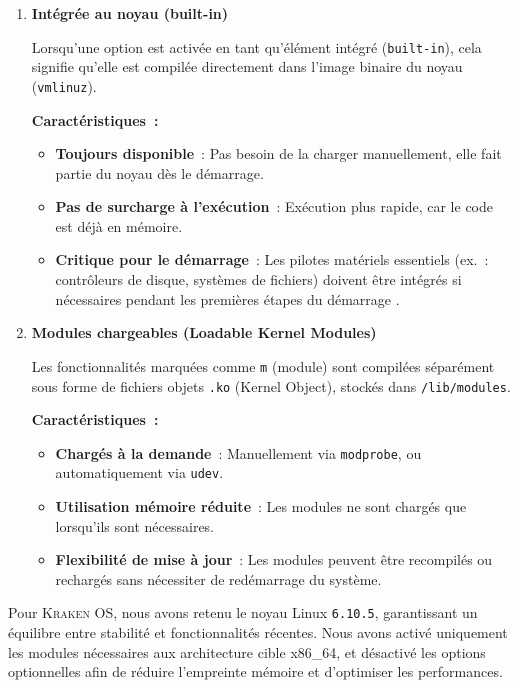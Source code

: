 \begin{enumerate}
  \item \textbf{Intégrée au noyau (built-in)}

  Lorsqu'une option est activée en tant qu’élément intégré (\texttt{built-in}), cela signifie qu’elle est compilée directement dans l’image binaire du noyau (\texttt{vmlinuz}).

  \textbf{Caractéristiques :}
  \begin{itemize}
    \item \textbf{Toujours disponible} : Pas besoin de la charger manuellement, elle fait partie du noyau dès le démarrage.
    \item \textbf{Pas de surcharge à l’exécution} : Exécution plus rapide, car le code est déjà en mémoire.
    \item \textbf{Critique pour le démarrage} : Les pilotes matériels essentiels (ex. : contrôleurs de disque, systèmes de fichiers) doivent être intégrés si nécessaires pendant les premières étapes du démarrage .
  \end{itemize}

  \item \textbf{Modules chargeables (Loadable Kernel Modules)}

  Les fonctionnalités marquées comme \texttt{m} (module) sont compilées séparément sous forme de fichiers objets \texttt{.ko} (Kernel Object), stockés dans \texttt{/lib/modules}.

  \textbf{Caractéristiques :}
  \begin{itemize}
    \item \textbf{Chargés à la demande} : Manuellement via \texttt{modprobe}, ou automatiquement via \texttt{udev}.
    \item \textbf{Utilisation mémoire réduite} : Les modules ne sont chargés que lorsqu’ils sont nécessaires.
    \item \textbf{Flexibilité de mise à jour} : Les modules peuvent être recompilés ou rechargés sans nécessiter de redémarrage du système.
  \end{itemize}
\end{enumerate}




Pour \textsc{Kraken OS}, nous avons retenu le noyau Linux \texttt{6.10.5}, garantissant un équilibre entre stabilité et fonctionnalités récentes. Nous avons activé uniquement les modules nécessaires aux architecture cible  x86\_64, et désactivé les options optionnelles afin de réduire l’empreinte mémoire et d’optimiser les performances. 


